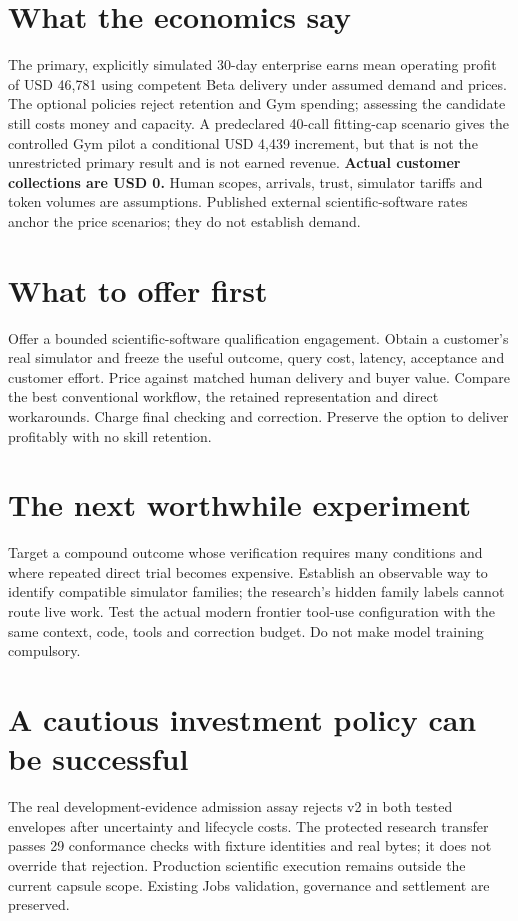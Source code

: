 \documentclass[11pt,letterpaper]{article}
\begin{document}
\section*{What the economics say}
The primary, explicitly simulated 30-day enterprise earns mean operating profit of USD 46,781 using competent Beta delivery under assumed demand and prices. The optional policies reject retention and Gym spending; assessing the candidate still costs money and capacity. A predeclared 40-call fitting-cap scenario gives the controlled Gym pilot a conditional USD 4,439 increment, but that is not the unrestricted primary result and is not earned revenue.
\textbf{Actual customer collections are USD 0.} Human scopes, arrivals, trust, simulator tariffs and token volumes are assumptions. Published external scientific-software rates anchor the price scenarios; they do not establish demand.
\newpage
\section*{What to offer first}
Offer a bounded scientific-software qualification engagement. Obtain a customer's real simulator and freeze the useful outcome, query cost, latency, acceptance and customer effort. Price against matched human delivery and buyer value. Compare the best conventional workflow, the retained representation and direct workarounds. Charge final checking and correction. Preserve the option to deliver profitably with no skill retention.
\section*{The next worthwhile experiment}
Target a compound outcome whose verification requires many conditions and where repeated direct trial becomes expensive. Establish an observable way to identify compatible simulator families; the research's hidden family labels cannot route live work. Test the actual modern frontier tool-use configuration with the same context, code, tools and correction budget. Do not make model training compulsory.
\section*{A cautious investment policy can be successful}
The real development-evidence admission assay rejects v2 in both tested envelopes after uncertainty and lifecycle costs. The protected research transfer passes 29 conformance checks with fixture identities and real bytes; it does not override that rejection. Production scientific execution remains outside the current capsule scope. Existing Jobs validation, governance and settlement are preserved.
\end{document}

